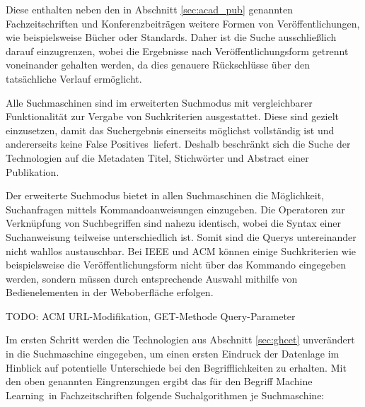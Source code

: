 Diese enthalten neben den in Abschnitt \ref{sec:acad_pub} genannten Fachzeitschriften und Konferenzbeiträgen weitere Formen von Veröffentlichungen, wie beispielsweise Bücher oder Standards. Daher ist die Suche ausschließlich darauf einzugrenzen, wobei die Ergebnisse nach Veröffentlichungsform getrennt voneinander gehalten werden, da dies genauere Rückschlüsse über den tatsächliche Verlauf ermöglicht.

Alle Suchmaschinen sind im erweiterten Suchmodus mit vergleichbarer Funktionalität zur Vergabe von Suchkriterien ausgestattet. Diese sind gezielt einzusetzen, damit das Suchergebnis einerseits möglichst vollständig ist und andererseits keine \glqq False Positives\grqq~liefert. Deshalb beschränkt sich die Suche der Technologien auf die Metadaten Titel, Stichwörter und Abstract einer Publikation.

Der erweiterte Suchmodus bietet in allen Suchmaschinen die Möglichkeit, Suchanfragen mittels Kommandoanweisungen einzugeben. Die Operatoren zur Verknüpfung von Suchbegriffen sind nahezu identisch, wobei die Syntax einer Suchanweisung teilweise unterschiedlich ist. Somit sind die Querys untereinander nicht wahllos austauschbar. Bei IEEE und ACM können einige Suchkriterien wie beispielsweise die Veröffentlichungsform nicht über das Kommando eingegeben werden, sondern müssen durch entsprechende Auswahl mithilfe von Bedienelementen in der Web\-oberfläche erfolgen.

TODO: ACM URL-Modifikation, GET-Methode Query-Parameter

Im ersten Schritt werden die Technologien aus Abschnitt \ref{sec:ghcet} unverändert in die Suchmaschine eingegeben, um einen ersten Eindruck der Datenlage im Hinblick auf potentielle Unterschiede bei den Begrifflichkeiten zu erhalten. Mit den oben genannten Eingrenzungen ergibt das für den Begriff \glqq Machine Learning\grqq~in Fachzeitschriften folgende Suchalgorithmen je Suchmaschine:


